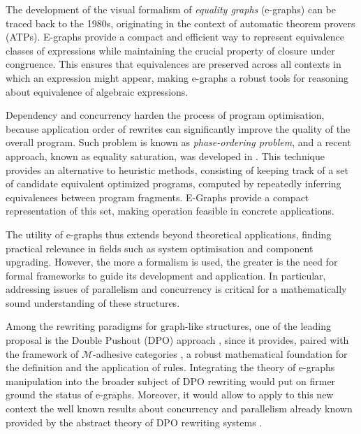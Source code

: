 The development of the visual formalism of \emph{equality graphs} (e-graphs) can be traced back to the 1980s, originating in the context of automatic theorem provers (ATPs). E-graphs provide a compact and efficient way to represent equivalence classes of expressions while maintaining the crucial property of closure under congruence. This ensures that equivalences are preserved across all contexts in which an expression might appear, making e-graphs a robust tools for reasoning about equivalence of algebraic expressions.

Dependency and concurrency harden the process of program optimisation, because application order of rewrites can significantly improve the quality of the overall program.
Such problem is known as \textit{phase-ordering problem}, and a recent approach, known as equality saturation, was developed in \cite{Tate_2011}.
This technique provides an alternative to heuristic methods, consisting of keeping track of a set of candidate equivalent optimized programs, 
computed by repeatedly inferring equivalences between program fragments.
E-Graphs provide a compact representation of this set, making operation feasible in concrete applications.

The utility of e-graphs thus extends beyond theoretical applications, finding practical relevance in fields such as system optimisation and component upgrading.
%
However, the more a formalism is used, the greater is the need for formal frameworks to guide its development and application. In particular, addressing issues of parallelism and concurrency is critical for 
a mathematically 
sound understanding of these structures.

Among the rewriting paradigms for graph-like structures, one of the leading proposal is the Double Pushout (DPO) approach \cite{Ehrig_Golas,ehrig2006fundamentals}, since it provides, paired with the framework of $\mathcal{M}$-adhesive  categories \cite{lack2005adhesive,azzi2019essence,behr2022fundamentals}, a robust mathematical foundation for the definition and the application of rules. 
%
Integrating the theory of e-graphs manipulation into the broader subject of DPO rewriting would put on firmer ground the status of e-graphs. Moreover, it would allow to apply to this new context the well known results about concurrency and parallelism already known provided by the abstract theory of DPO rewriting systems \cite{baldan1999concurrent,ehrig1999handbook}. 
 
